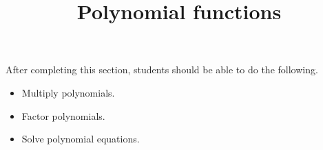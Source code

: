 \documentclass{ximera}
\title{Polynomial functions}
\begin{document}
\begin{abstract} 
\end{abstract}

\maketitle

\begin{sectionOutcomes}
After completing this section, students should be able to do the following.

\begin{itemize}
	\item Multiply polynomials.
	\item Factor polynomials.
	\item Solve polynomial equations.
\end{itemize}
\end{sectionOutcomes}
\end{document}
